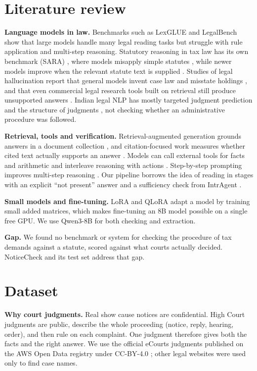 \documentclass[10pt,a4paper]{article}
\begin{document}
\section{Literature review}

\textbf{Language models in law.} Benchmarks such as LexGLUE \cite{lexglue} and LegalBench \cite{legalbench} show that large models handle many legal reading tasks but struggle with rule application and multi-step reasoning. Statutory reasoning in tax law has its own benchmark (SARA) \cite{sara}, where models misapply simple statutes \cite{blairstanek}, while newer models improve when the relevant statute text is supplied \cite{nay}. Studies of legal hallucination report that general models invent case law and misstate holdings \cite{dahl}, and that even commercial legal research tools built on retrieval still produce unsupported answers \cite{magesh}. Indian legal NLP has mostly targeted judgment prediction \cite{ildc} and the structure of judgments \cite{rhetorical}, not checking whether an administrative procedure was followed.

\textbf{Retrieval, tools and verification.} Retrieval-augmented generation grounds answers in a document collection \cite{rag}, and citation-focused work measures whether cited text actually supports an answer \cite{alce}. Models can call external tools for facts and arithmetic \cite{toolformer} and interleave reasoning with actions \cite{react}. Step-by-step prompting improves multi-step reasoning \cite{cot}. Our pipeline borrows the idea of reading in stages with an explicit ``not present'' answer and a sufficiency check from IntrAgent \cite{intragent}.

\textbf{Small models and fine-tuning.} LoRA \cite{lora} and QLoRA \cite{qlora} adapt a model by training small added matrices, which makes fine-tuning an 8B model possible on a single free GPU. We use Qwen3-8B \cite{qwen3} for both checking and extraction.

\textbf{Gap.} We found no benchmark or system for checking the procedure of tax demands against a statute, scored against what courts actually decided. NoticeCheck and its test set address that gap.

\section{Dataset}

\textbf{Why court judgments.} Real show cause notices are confidential. High Court judgments are public, describe the whole proceeding (notice, reply, hearing, order), and then rule on each complaint. One judgment therefore gives both the facts and the right answer. We use the official eCourts judgments published on the AWS Open Data registry under CC-BY-4.0 \cite{awsdata}; other legal websites were used only to find case names.
\end{document}

